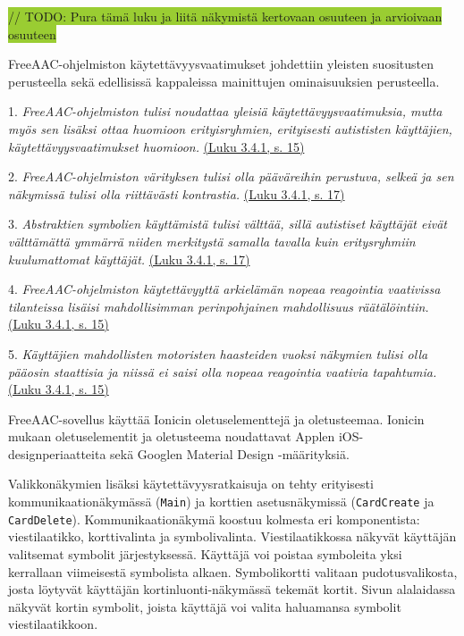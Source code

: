 \documentclass[utf8]{gradu3}
\begin{document}
\colorbox{YellowGreen}{// TODO: Pura tämä luku ja liitä näkymistä kertovaan osuuteen ja arvioivaan osuuteen}

FreeAAC-ohjelmiston käytettävyysvaatimukset johdettiin yleisten suositusten perusteella sekä edellisissä kappaleissa mainittujen ominaisuuksien perusteella.

1. \textit{FreeAAC-ohjelmiston tulisi noudattaa yleisiä käytettävyysvaatimuksia, mutta myös sen lisäksi ottaa huomioon erityisryhmien, erityisesti autististen käyttäjien, käytettävyysvaatimukset huomioon.} \hyperref[general-usability-requirements]{(Luku 3.4.1, s. 15)}

2. \textit{FreeAAC-ohjelmiston värityksen tulisi olla pääväreihin perustuva, selkeä ja sen näkymissä tulisi olla riittävästi kontrastia.} \hyperref[AAC-colors]{(Luku 3.4.1, s. 17)}

3. \textit{Abstraktien symbolien käyttämistä tulisi välttää, sillä autistiset käyttäjät eivät välttämättä ymmärrä niiden merkitystä samalla tavalla kuin eritysryhmiin kuulumattomat käyttäjät.} \hyperref[AAC-abstract-symbols]{(Luku 3.4.1, s. 17)}

4. \textit{FreeAAC-ohjelmiston käytettävyyttä arkielämän nopeaa reagointia vaativissa tilanteissa lisäisi mahdollisimman perinpohjainen mahdollisuus räätälöintiin.} \hyperref[AAC-context-settings]{(Luku 3.4.1, s. 15)}

5. \textit{Käyttäjien mahdollisten motoristen haasteiden vuoksi näkymien tulisi olla pääosin staattisia ja niissä ei saisi olla nopeaa reagointia vaativia tapahtumia.} \hyperref[AAC-staticity]{(Luku 3.4.1, s. 15)}

FreeAAC-sovellus käyttää Ionicin oletuselementtejä ja oletusteemaa. Ionicin mukaan oletuselementit ja oletusteema noudattavat Applen iOS-designperiaatteita sekä Googlen Material Design -määrityksiä.  

Valikkonäkymien lisäksi käytettävyysratkaisuja on tehty erityisesti kommunikaationäkymässä (\texttt{Main}) ja korttien asetusnäkymissä (\texttt{CardCreate} ja \texttt{CardDelete}). Kommunikaationäkymä koostuu kolmesta eri komponentista: viestilaatikko, korttivalinta ja symbolivalinta. Viestilaatikkossa näkyvät käyttäjän valitsemat symbolit järjestyksessä. Käyttäjä voi poistaa symboleita yksi kerrallaan viimeisestä symbolista alkaen. Symbolikortti valitaan pudotusvalikosta, josta löytyvät käyttäjän kortinluonti-näkymässä tekemät kortit. Sivun alalaidassa näkyvät kortin symbolit, joista käyttäjä voi valita haluamansa symbolit viestilaatikkoon.
\end{document}
